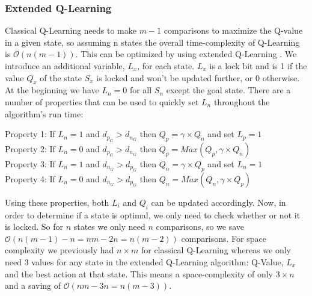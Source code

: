 \subsubsection{Extended Q-Learning}
\label{sec:extended-q-learning}
Classical Q-Learning needs to make $m-1$ comparisons to maximize the Q-value in a given state, so assuming n states the overall time-complexity of Q-Learning is $\mathcal O(n(m-1))$. This can be optimized by using extended Q-Learning \cite{11}. We introduce an additional variable, $L_x$, for each state. $L_x$ is a lock bit and is 1 if the value $Q_x$ of the state $S_x$ is locked and won't be updated further, or 0 otherwise. At the beginning we have $L_n=0$ for all $S_n$ except the goal state. There are a number of properties that can be used to quickly set $L_n$ throughout the algorithm's run time: 

\vspace{1\baselineskip}\vspace{-\parskip}

\begin{flushleft}
Property 1: If $L_n=1$ and $d_p_G > d_n_G$ then $Q_p = \gamma \times Q_n$ and set $L_p=1$\\
Property 2: If $L_n=0$ and $d_p_G > d_n_G$ then $Q_p = Max(Q_p,\gamma \times Q_n)$\\
Property 3: If $L_n=1$ and $d_n_G > d_p_G$ then $Q_n = \gamma \times Q_p$ and set $L_n=1$\\
Property 4: If $L_n=0$ and $d_n_G > d_p_G$ then $Q_n = Max(Q_n,\gamma \times Q_p)$\\
\end{flushleft}

\vspace{1\baselineskip}\vspace{-\parskip}

Using these properties, both $L_i$ and $Q_i$ can be updated accordingly. Now, in order to determine if a state is optimal, we only need to check whether or not it is locked. So for $n$ states we only need $n$ comparisons, so we save $\mathcal O(n(m-1)-n=nm-2n=n(m-2))$ \cite{11} comparisons.
For space complexity we previously had $n \times m $ for classical Q-Learning whereas we only need $3$ values for any state in the extended Q-Learning algorithm: Q-Value, $L_x$ and the best action at that state. This means a space-complexity of only $3 \times n$ and a saving of $\mathcal O(nm-3n=n(m-3))$.\cite{11}



